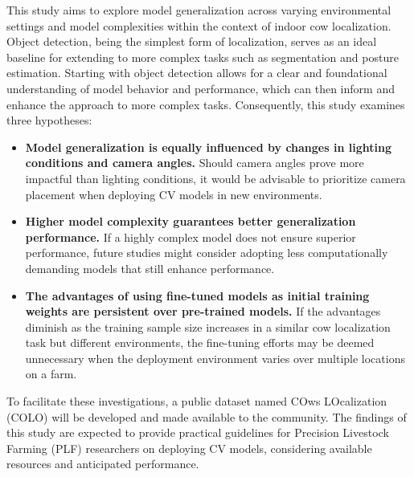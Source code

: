 This study aims to explore model generalization across varying environmental settings and model complexities within the context of indoor cow localization. Object detection, being the simplest form of localization, serves as an ideal baseline for extending to more complex tasks such as segmentation and posture estimation. Starting with object detection allows for a clear and foundational understanding of model behavior and performance, which can then inform and enhance the approach to more complex tasks. Consequently, this study examines three hypotheses:

\begin{itemize}
    \item \textbf{Model generalization is equally influenced by changes in lighting conditions and camera angles.} Should camera angles prove more impactful than lighting conditions, it would be advisable to prioritize camera placement when deploying CV models in new environments.
    \item \textbf{Higher model complexity guarantees better generalization performance.} If a highly complex model does not ensure superior performance, future studies might consider adopting less computationally demanding models that still enhance performance.
    \item \textbf{The advantages of using fine-tuned models as initial training weights are persistent over pre-trained models.} If the advantages diminish as the training sample size increases in a similar cow localization task but different environments, the fine-tuning efforts may be deemed unnecessary when the deployment environment varies over multiple locations on a farm.
\end{itemize}

To facilitate these investigations, a public dataset named COws LOcalization (COLO) \cite{COLODataset2023} will be developed and made available to the community. The findings of this study are expected to provide practical guidelines for Precision Livestock Farming (PLF) researchers on deploying CV models, considering available resources and anticipated performance.